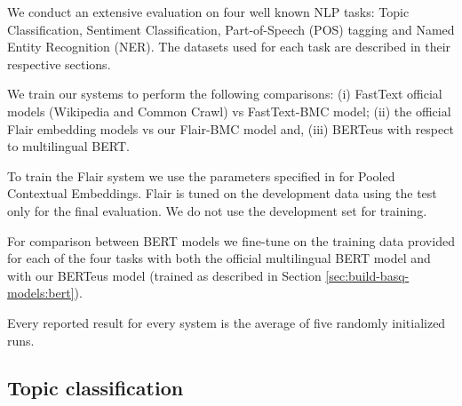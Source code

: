 \documentclass[10pt, a4paper]{article}
\begin{document}







We conduct an extensive evaluation on four well known NLP tasks: Topic Classification, Sentiment Classification, Part-of-Speech (POS) tagging and Named Entity Recognition (NER). The datasets used for each task are described in their respective sections.

We train our systems to perform the following comparisons: (i) FastText official models (Wikipedia and Common Crawl) vs FastText-BMC model; (ii) the official Flair embedding models vs our Flair-BMC model and, (iii) BERTeus with respect to multilingual BERT.

To train the Flair system we use the parameters specified in \cite{akbik2019naacl} for Pooled Contextual Embeddings. Flair is tuned on the development data using the test only for the final evaluation. We do not use the development set for training.

For comparison between BERT models we fine-tune on the training data provided for each of the four tasks with both the official multilingual BERT \cite{devlin2019bert} model and with our BERTeus model (trained as described in Section \ref{sec:build-basq-models:bert}).

Every reported result for every system is the average of five randomly initialized runs.

\subsection{Topic classification}\label{sec:topic}
\end{document}
